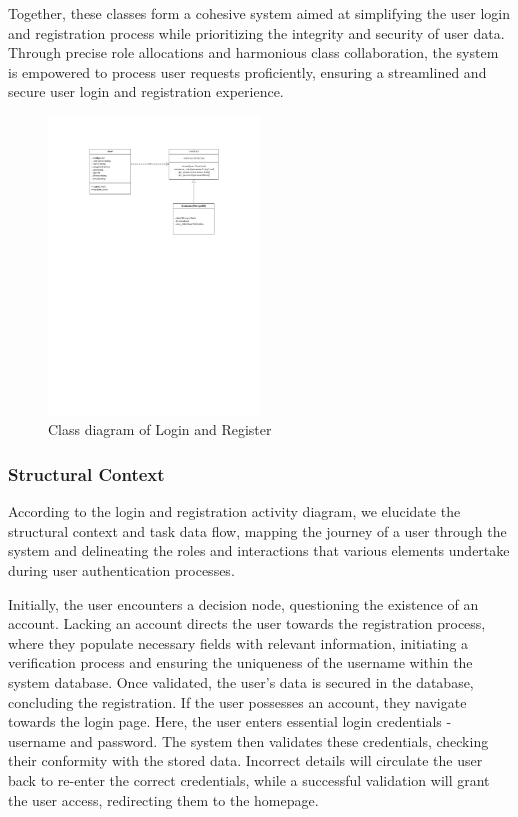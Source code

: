 \documentclass[conference]{IEEEtran}
\begin{document}
Together, these classes form a cohesive system aimed at simplifying the user login and registration process while prioritizing the integrity and security of user data. Through precise role allocations and harmonious class collaboration, the system is empowered to process user requests proficiently, ensuring a streamlined and secure user login and registration experience.
\begin{figure}[htbp]
	\centerline{\includegraphics[width=0.5\textwidth]{Diagram_of_Login_and_Register/Class_diagram_of_login_regist.pdf}}
	\caption{Class diagram of Login and Register }
	\label{Class_diagram_of_login_regist}
\end{figure}
\subsubsection{\textbf{Structural Context }}
\textbf{}

According to the login and registration activity diagram, we elucidate the structural context and task data flow, mapping the journey of a user through the system and delineating the roles and interactions that various elements undertake during user authentication processes.

Initially, the user encounters a decision node, questioning the existence of an account. Lacking an account directs the user towards the registration process, where they populate necessary fields with relevant information, initiating a verification process and ensuring the uniqueness of the username within the system database. Once validated, the user’s data is secured in the database, concluding the registration.
If the user possesses an account, they navigate towards the login page. Here, the user enters essential login credentials - username and password. The system then validates these credentials, checking their conformity with the stored data. Incorrect details will circulate the user back to re-enter the correct credentials, while a successful validation will grant the user access, redirecting them to the homepage.
\end{document}
